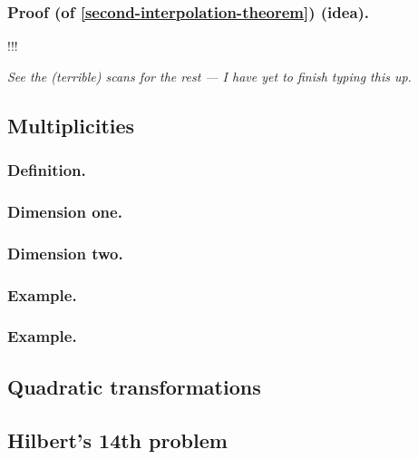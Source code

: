 \documentclass[10pt]{article}
\numberwithin{equation}{subsubsection}
\begin{document}
            \subsubsection{Proof (of \ref{second-interpolation-theorem}) (idea).} !!!

            \emph{See the (terrible) scans for the rest — I have yet to finish typing this up.}
            
        \subsection{Multiplicities}
        
            \subsubsection{Definition.}
            
            \subsubsection{Dimension one.}
            
            \subsubsection{Dimension two.}
            
            \subsubsection{Example.}
            
            \subsubsection{Example.}
        
        \subsection{Quadratic transformations}
        
        \subsection{Hilbert's 14th problem}
    
\end{document}
